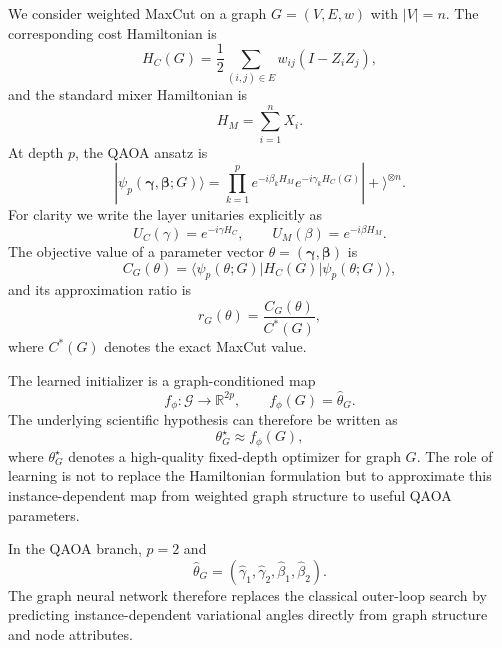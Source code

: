 \documentclass[
  reprint,
  twocolumn,
  aps,
  superscriptaddress,
  longbibliography,
  floatfix
]{revtex4-2}
\begin{document}
We consider weighted MaxCut on a graph $G=(V,E,w)$ with $|V|=n$. The corresponding cost Hamiltonian is
\begin{equation}
H_C(G) = \frac{1}{2} \sum_{(i,j)\in E} w_{ij} (I - Z_i Z_j),
\end{equation}
and the standard mixer Hamiltonian is
\begin{equation}
H_M = \sum_{i=1}^{n} X_i.
\end{equation}
At depth $p$, the QAOA ansatz is
\begin{equation}
|\psi_p(\boldsymbol{\gamma},\boldsymbol{\beta};G)\rangle =
\prod_{k=1}^{p} e^{-i \beta_k H_M} e^{-i \gamma_k H_C(G)} |+\rangle^{\otimes n}.
\end{equation}
For clarity we write the layer unitaries explicitly as
\begin{equation}
U_C(\gamma) = e^{-i\gamma H_C}, \qquad U_M(\beta) = e^{-i\beta H_M}.
\end{equation}
The objective value of a parameter vector $\theta=(\boldsymbol{\gamma},\boldsymbol{\beta})$ is
\begin{equation}
C_G(\theta) = \langle \psi_p(\theta;G) | H_C(G) | \psi_p(\theta;G) \rangle,
\end{equation}
and its approximation ratio is
\begin{equation}
r_G(\theta) = \frac{C_G(\theta)}{C^*(G)},
\end{equation}
where $C^*(G)$ denotes the exact MaxCut value.

The learned initializer is a graph-conditioned map
\begin{equation}
f_{\phi}: \mathcal{G} \rightarrow \mathbb{R}^{2p}, \qquad
f_{\phi}(G) = \hat{\theta}_G.
\end{equation}
The underlying scientific hypothesis can therefore be written as
\begin{equation}
\theta_G^{\star} \approx f_{\phi}(G),
\end{equation}
where $\theta_G^{\star}$ denotes a high-quality fixed-depth optimizer for graph $G$. The role of learning is not to replace the Hamiltonian formulation but to approximate this instance-dependent map from weighted graph structure to useful QAOA parameters.

In the QAOA branch, $p=2$ and
\begin{equation}
\hat{\theta}_G = (\hat{\gamma}_1,\hat{\gamma}_2,\hat{\beta}_1,\hat{\beta}_2).
\end{equation}
The graph neural network therefore replaces the classical outer-loop search by predicting instance-dependent variational angles directly from graph structure and node attributes.
\end{document}
